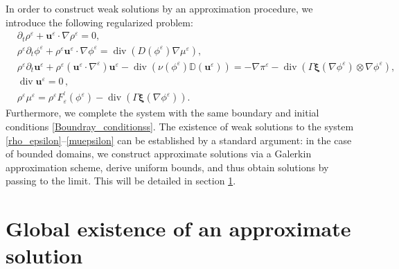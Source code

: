 \documentclass[11pt]{article}
\def\bfu{\mathbf{u}}
\def\bfxi{\boldsymbol{\xi}}
\begin{document}
In order to construct weak solutions by an approximation procedure, we introduce the following regularized problem:
\begin{align}
&\partial_t \rho^{\varepsilon} + \mathbf{u}^{\varepsilon} \cdot \nabla \rho^{\varepsilon} = 0, \label{rho_epsilon} \\
&\rho^{\varepsilon} \partial_t \phi^{\varepsilon} + \rho^{\varepsilon} \mathbf{u}^{\varepsilon} \cdot \nabla \phi^{\varepsilon} = \operatorname{div} (D(\phi^{\varepsilon}) \nabla \mu^{\varepsilon}), \label{phi_epsilon} \\
&\rho^{\varepsilon} \partial_t \mathbf{u}^{\varepsilon} + \rho^{\varepsilon} (\mathbf{u}^{\varepsilon} \cdot \nabla^{\varepsilon}) \mathbf{u}^{\varepsilon} - \operatorname{div}(\nu(\phi^{\varepsilon}) \mathbb{D}(\mathbf{u}^{\varepsilon})) = -\nabla \pi^{\varepsilon} - \operatorname{div}(\Gamma \mathbf{\bfxi}(\nabla \phi^{\varepsilon}) \otimes \nabla \phi^{\varepsilon})\label{velocity_S_epsilon}, \\
&{ \operatorname{div}\bfu^{\varepsilon} = 0\,,}
\\
&\rho^{\varepsilon} \mu^{\varepsilon} = \rho^{\varepsilon} F^{\prime}_{\varepsilon} (\phi^{\varepsilon}) - \operatorname{div}(\Gamma \mathbf{\bfxi}(\nabla \phi^{\varepsilon})). \label{muepsilon}
\end{align}
Furthermore, we complete the system with the same boundary and initial conditions \eqref{Boundray_conditionss}. The existence of weak solutions to the system \eqref{rho_epsilon}--\eqref{muepsilon} can be established by a standard argument: in the case of bounded domains, we construct approximate solutions via a Galerkin approximation scheme, derive uniform bounds, and thus obtain solutions by passing to the limit. This will be detailed in section \ref{Galerkin scheme}.


\section{Global existence of an approximate solution}\label{Galerkin scheme}
\end{document}
